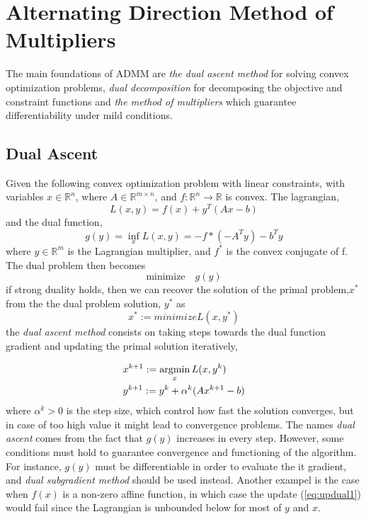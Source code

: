 \section{Alternating Direction Method of Multipliers}

The main foundations of ADMM are \textit{the dual ascent method} for solving convex optimization problems, \textit{dual decomposition} for decomposing the objective and constraint functions and \textit{the method of multipliers} which guarantee differentiability under mild conditions.

\subsection{Dual Ascent}

Given the following convex optimization problem with linear constraints,
with variables $x \in \mathbb{R}^n$, where $A \in \mathbb{R}^{m\times n}$, and $f: \mathbb{R}^n \rightarrow \mathbb{R}$ is convex. The lagrangian,
\begin{equation*}
	L(x,y)=f(x) + y^T(Ax-b)
\end{equation*}
and the dual function,
\begin{equation*}
	g(y) = \inf_x L(x,y) = -f*(-A^Ty)-b^Ty
\end{equation*}
where $y \in \mathbb{R}^m$ is the Lagrangian multiplier, and $f^*$ is the convex conjugate of f. The dual problem then becomes 
\begin{equation*}
	\mbox{minimize} \quad g(y)
\end{equation*}
if strong duality holds, then we can recover the solution of the primal problem,$x^*$ from the the dual problem solution, $y^*$ as
\begin{equation*}
	x^* := minimize L(x,y^*)
\end{equation*}
the \textit{dual ascent method} consists on taking steps towards the dual function gradient and updating the primal solution iteratively,

\begin{align}
&x^{k+1} := \operatorname*{argmin}_x L(x,y^k) \label{eq:updual1}\\ 
&y^{k+1} := y^k + \alpha^k(Ax^{k+1}-b) \label{dual2}
\end{align}
where $\alpha^k>0$ is the step size, which control how fast the solution converges, but in case of too high value it might lead to convergence problems. The names \textit{dual ascent} comes from the fact that $g(y)$ increases in every step. However, some conditions must hold to guarantee convergence and functioning of the algorithm. For instance, $g(y)$ must be differentiable in order to evaluate the it gradient, and \textit{dual subgradient method} should be used instead. Another exampel is the case when $f(x)$ is a non-zero affine function, in which case the update (\ref{eq:updual1}) would fail since the Lagrangian is unbounded below for most of $y$ and $x$.

